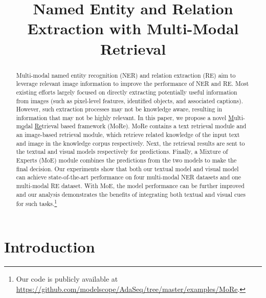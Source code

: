 \documentclass[11pt]{article}
\title{Named Entity and Relation Extraction with Multi-Modal Retrieval}
\author{Xinyu Wang, Jiong Cai, Yong Jiang, Pengjun Xie, 
\textbf{Kewei Tu\thanks{\hspace{1mm} Yong Jiang and Kewei Tu are the corresponding authors. : equal contributions. This work was done when Xinyu Wang was visiting StatNLP Research Group at SUTD.}, \and Wei Lu} \\
 School of Information Science and Technology, ShanghaiTech University \\
 Shanghai Engineering Research Center of Intelligent Vision and Imaging \\
 Shanghai Institute of Microsystem and Information Technology, Chinese Academy of Sciences \\
 University of Chinese Academy of Sciences \\
 StatNLP Research Group, Singapore University of Technology and Design \\
  {\tt \{wangxy1,caijiong,tukw\}@shanghaitech.edu.cn} \\
  {\tt \{jiangyong.ml,xpjandy\}@gmail.com} \\
  {\tt luwei@sutd.edu.sg} \\
}
\begin{document}
\maketitle


\begin{abstract}
Multi-modal named entity recognition (NER) and relation extraction (RE) aim to leverage relevant image information to improve the performance of NER and RE. 
Most existing efforts largely focused on directly extracting potentially useful information from images (such as pixel-level features, identified objects, and associated captions).
However, such extraction processes may not be knowledge aware, resulting in information that may not be highly relevant.
In this paper, we propose a novel \underline{M}ulti-m\underline{o}dal \underline{Re}trieval based framework (MoRe).
MoRe contains a text retrieval module and an image-based retrieval module, which retrieve related knowledge of the input text and image in the knowledge corpus respectively.
Next, the retrieval results are sent to the textual and visual models respectively for predictions.
Finally, a Mixture of Experts (MoE) module combines the predictions from the two models to make the final decision.
Our experiments show that both our textual model and visual model can achieve state-of-the-art performance on four multi-modal NER datasets and one multi-modal RE dataset.
With MoE, the model performance can be further improved and our analysis demonstrates the benefits of integrating both textual and visual cues for such tasks.\footnote{Our code is publicly available at \url{https://github.com/modelscope/AdaSeq/tree/master/examples/MoRe}.} \end{abstract}

\section{Introduction}
\end{document}
